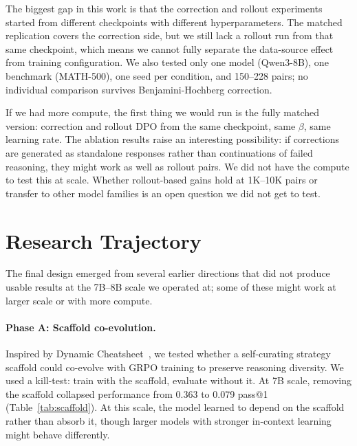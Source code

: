 \documentclass{article}
\begin{document}
The biggest gap in this work is that the correction and rollout experiments started from different checkpoints with different hyperparameters.
The matched replication covers the correction side, but we still lack a rollout run from that same checkpoint, which means we cannot fully separate the data-source effect from training configuration.
We also tested only one model (Qwen3-8B), one benchmark (MATH-500), one seed per condition, and 150--228 pairs; no individual comparison survives Benjamini-Hochberg correction.

If we had more compute, the first thing we would run is the fully matched version: correction and rollout DPO from the same checkpoint, same $\beta$, same learning rate.
The ablation results raise an interesting possibility: if corrections are generated as standalone responses rather than continuations of failed reasoning, they might work as well as rollout pairs.
We did not have the compute to test this at scale.
Whether rollout-based gains hold at 1K--10K pairs or transfer to other model families is an open question we did not get to test.


\appendix

\section{Research Trajectory}
\label{app:trajectory}

The final design emerged from several earlier directions that did not produce usable results at the 7B--8B scale we operated at; some of these might work at larger scale or with more compute.

\paragraph{Phase A: Scaffold co-evolution.}
Inspired by Dynamic Cheatsheet~\cite{suzgun2025dc}, we tested whether a self-curating strategy scaffold could co-evolve with GRPO training to preserve reasoning diversity.
We used a kill-test: train with the scaffold, evaluate without it.
At 7B scale, removing the scaffold collapsed performance from 0.363 to 0.079 pass@1 (Table~\ref{tab:scaffold}).
At this scale, the model learned to depend on the scaffold rather than absorb it, though larger models with stronger in-context learning might behave differently.
\end{document}
